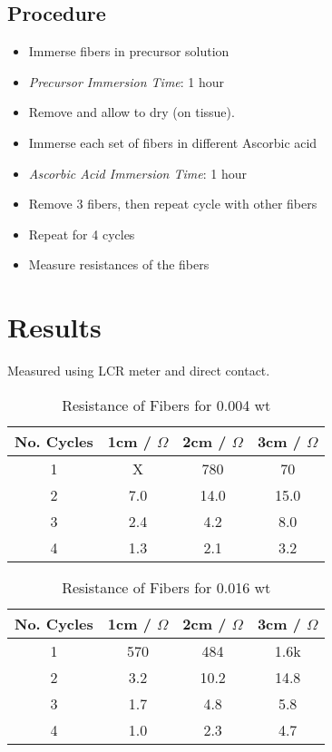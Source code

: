 \documentclass{article}
\begin{document}
\subsection{Procedure}
\begin{itemize}
    \item Immerse fibers in precursor solution
    \item \textit{Precursor Immersion Time}: 1 hour
    \item Remove and allow to dry (on tissue).
    \item Immerse each set of fibers in different Ascorbic acid
    \item \textit{Ascorbic Acid Immersion Time}: 1 hour 
    \item Remove 3 fibers, then repeat cycle with other fibers 
    \item Repeat for 4 cycles
    \item Measure resistances of the fibers
\end{itemize}

\pagebreak
\section{Results}
Measured using LCR meter and direct contact.
\begin{table}[h!]
\centering
\begin{tabular}{ |c|c|c|c| } 
    \hline
    No. Cycles &  1cm / $\Omega$ & 2cm / $\Omega$ & 3cm / $\Omega$  \\
    \hline
    1 & X & 780 & 70 \\
    2 & 7.0 & 14.0 & 15.0\\
    3 & 2.4 & 4.2 & 8.0\\
    4 & 1.3 & 2.1 & 3.2\\
    \hline
\end{tabular}
 \caption{Resistance of Fibers for 0.004 wt}
\label{table:1}
\end{table}

\begin{table}[h!]
\centering
\begin{tabular}{ |c|c|c|c| } 
    \hline
    No. Cycles &  1cm / $\Omega$ & 2cm / $\Omega$ & 3cm / $\Omega$  \\
    \hline
    1 & 570 & 484 & 1.6k \\
    2 & 3.2 & 10.2 & 14.8\\
    3 & 1.7 & 4.8 & 5.8\\
    4 & 1.0 & 2.3 & 4.7\\
    \hline
\end{tabular}
 \caption{Resistance of Fibers for 0.016 wt}
\label{table:2}
\end{table}
\end{document}
